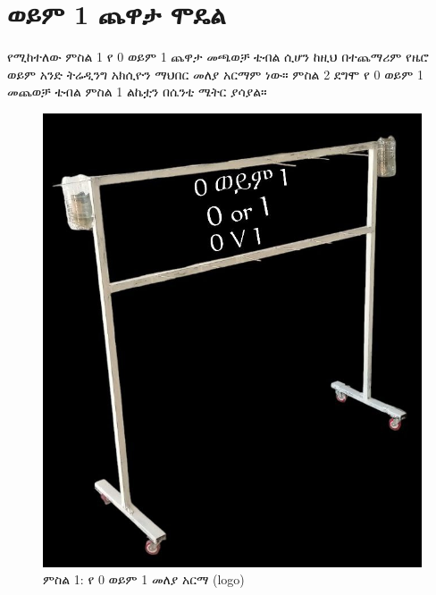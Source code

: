 \documentclass[a4paper,12pt]{article}
\newenvironment{geez}{\geezfont}{}
\begin{document}
\section{\begin{geez}0 ወይም 1 ጨዋታ ሞዴል\end{geez}}
የሚከተለው ምስል 1 የ 0 ወይም 1 ጨዋታ መጫወቻ ቴብል ሲሆን ከዚህ በተጨማሪም የዜሮ ወይም አንድ ትሬዲንግ አክሲዮን ማህበር መለያ አርማም ነው። ምስል 2 ደግሞ የ 0 ወይም 1 መጨወቻ ቴብል ምስል 1 ልኬቷን በሴንቲ ሜትር ያሳያል።
\begin{center}
\begin{figure}[h!]
\centering
\includegraphics[scale=0.3]{0_or_1}
\caption{ምስል 1: የ 0 ወይም 1 መለያ አርማ (logo)}
\end{figure}
\end{center}
\newpage
\end{document}
